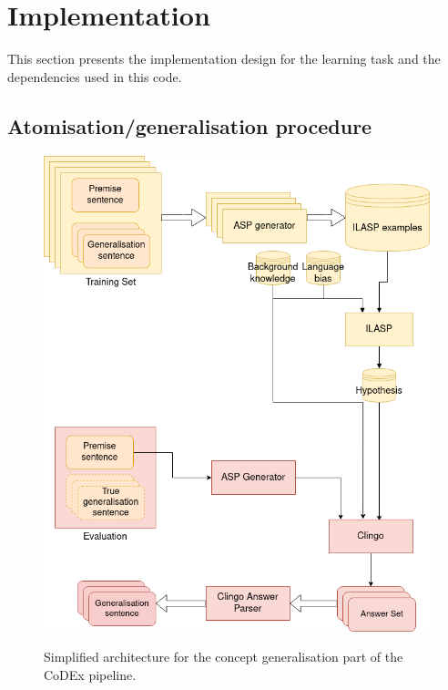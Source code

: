 \section{Implementation}

This section presents the implementation design for the learning task and the dependencies used in this code.

\subsection{Atomisation/generalisation procedure}



\begin{figure}[h]
\caption{Simplified architecture for the concept generalisation part of the CoDEx pipeline.} 
\centering
\includegraphics[width=\textwidth]{solving-nlp-tasks-logically/simplified architecture diagram.png}
\label{generalisation-architecture-diagram}
\end{figure}


